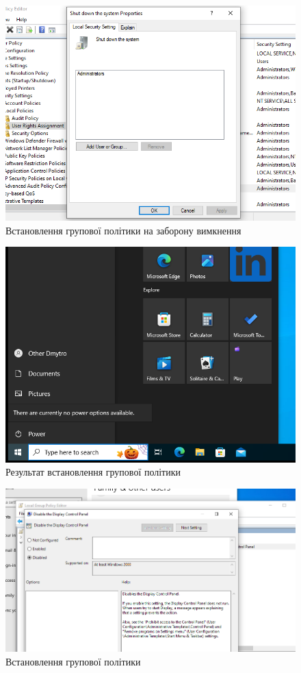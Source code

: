 \documentclass[oneside,14pt]{extarticle}
\begin{document}
\begin{normalsize}
	\begin{figure}[H]
		\centering
		\includegraphics[width=\columnwidth]{4}
		\caption{Встановлення групової політики на заборону вимкнення}
	\end{figure}
	
	\begin{figure}[H]
		\centering
		\includegraphics[width=\columnwidth]{5}
		\caption{Результат встановлення групової політики}
	\end{figure}
	
	\begin{figure}[H]
		\centering
		\includegraphics[width=\columnwidth]{6}
		\caption{Встановлення групової політики}
	\end{figure}
	

\end{normalsize}
\end{document}
